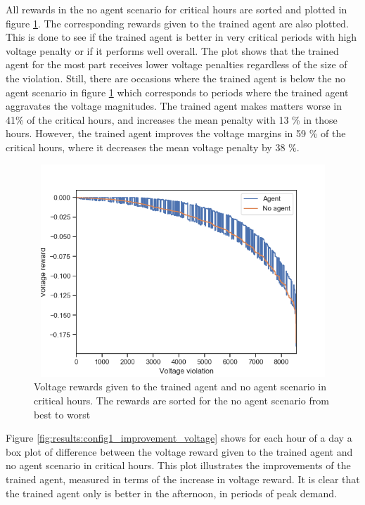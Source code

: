 \documentclass[class=book, crop=false]{standalone}
\begin{document}
All rewards in the no agent scenario for critical hours are sorted and plotted in figure \ref{fig:results:config1_sorted_voltage}. The corresponding rewards given to the trained agent are also plotted. This is done to see if the trained agent is better in very critical periods with high voltage penalty or if it performs well overall. The plot shows that the trained agent for the most part receives lower voltage penalties regardless of the size of the violation. Still, there are occasions where the trained agent is below the no agent scenario in figure \ref{fig:results:config1_sorted_voltage} which corresponds to periods where the trained agent aggravates the voltage magnitudes. The trained agent makes matters worse in 41\% of the critical hours, and increases the mean penalty with 13 \% in those hours. However, the trained agent improves the voltage margins in 59 \% of the critical hours, where it decreases the mean voltage penalty by 38 \%.



\begin{figure}[h]
    \center
\includegraphics[height=8cm, width=12cm]{figures/config1_sorted_voltage.png}
    \caption[size = 9]{Voltage rewards given to the trained agent and no agent scenario in critical hours. The rewards are sorted for the no agent scenario from best to worst}
    \label{fig:results:config1_sorted_voltage}
\end{figure}


Figure \ref{fig:results:config1_improvement_voltage} shows for each hour of a day a box plot of difference between the voltage reward given to the trained agent and no agent scenario in critical hours. This plot illustrates the improvements of the trained agent, measured in terms of the increase in voltage reward. It is clear that the trained agent only is better in the afternoon, in periods of peak demand. 
\end{document}
